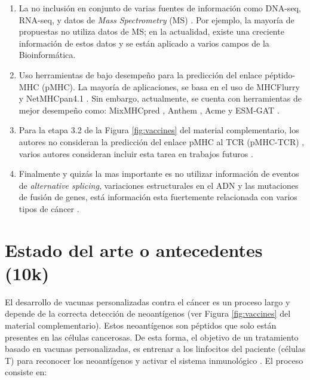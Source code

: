 \documentclass[a4paper,11pt]{article}
\begin{document}
\begin{enumerate}
	\item La no inclusión en conjunto de varias fuentes de información como DNA-seq, RNA-seq, y datos de \textit{Mass Spectrometry} (MS) \cite{kim2018neopepsee}. Por ejemplo, la mayoría de  propuestas no utiliza datos de MS; en la actualidad, existe una creciente información de estos datos y se están aplicado a varios campos de la Bioinformática.
	
	\item  Uso herramientas de bajo desempeño para la predicción del enlace péptido-MHC (pMHC). La mayoría de aplicaciones, se basa en el uso de MHCFlurry \cite{o2020mhcflurry} y NetMHCpan4.1 \cite{reynisson2020netmhcpan}. Sin embargo, actualmente, se cuenta con herramientas de mejor desempeño como: MixMHCpred \cite{gfeller2023improved},  Anthem \cite{mei2021anthem}, Acme \cite{hu2019acme} y ESM-GAT \cite{hashemi2023improved}.
	
	\item Para la etapa 3.2 de la Figura \ref{fig:vaccines} del material complementario, los autores no consideran  la predicción del enlace pMHC al TCR (pMHC-TCR) , varios autores consideran incluir esta tarea en trabajos futuros  \cite{rubinsteyn2018computational}.
	
	\item Finalmente y quizás la mas importante es no utilizar información de eventos de \textit{alternative splicing}, variaciones estructurales en el ADN y las mutaciones de fusión de genes, está información esta fuertemente relacionada con varios tipos de cáncer \cite{wood2020neoepiscope}.
\end{enumerate}

\section{Estado del arte o antecedentes (10k)}
	

	
El desarrollo de vacunas personalizadas contra el cáncer es un proceso largo y depende de la correcta detección de neoantígenos (ver Figura \ref{fig:vaccines} del material complementario). Estos neoantígenos son péptidos que solo están presentes en las células cancerosas. De esta forma, el objetivo de un tratamiento basado en vacunas personalizadas, es entrenar a los linfocitos del paciente (células T) para reconocer los neoantígenos y activar el sistema inmunológico \cite{de2020neoantigen, peng2019neoantigen}. El proceso consiste en: 
	
\end{document}
